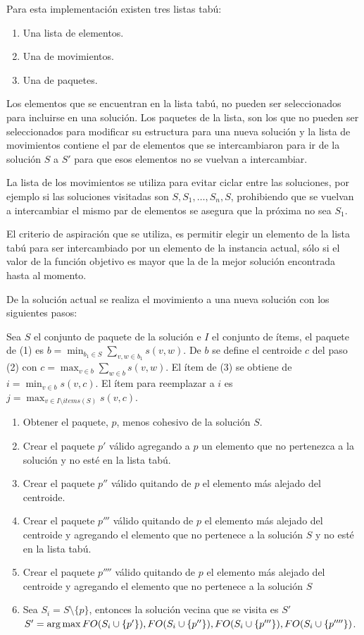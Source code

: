 Para esta implementación existen tres listas tabú: 
\begin{enumerate}
	\item Una lista de elementos.
	\item Una de movimientos.
	\item Una de paquetes.
\end{enumerate}

Los elementos que se encuentran en la lista tabú, no pueden ser seleccionados para incluirse en una solución. Los paquetes de la lista, son los que no pueden ser seleccionados para modificar su estructura para una nueva solución y la lista de movimientos contiene el par de elementos que se intercambiaron para ir de la solución $S$ a $S'$ para que esos elementos no se vuelvan a intercambiar.

La lista de los movimientos se utiliza para evitar ciclar entre las soluciones, por ejemplo si las soluciones visitadas son $S, S_1, \ldots, S_n, S$, prohibiendo que se vuelvan a intercambiar el mismo par de elementos se asegura que la próxima no sea $S_1$.

El criterio de aspiración que se utiliza, es permitir elegir un elemento de la lista tabú para ser intercambiado por un elemento de la instancia actual, sólo si el valor de la función objetivo es mayor que la de la mejor solución encontrada hasta al momento.

De la solución actual se realiza el movimiento a una nueva solución con los siguientes pasos:

Sea $S$ el conjunto de paquete de la solución e $I$ el conjunto de ítems, el paquete de (1) es $b = \min_{b_1 \in S}{\sum_{v,w \in b_1}{s(v,w)}}$. De $b$ se define el centroide $c$ del paso (2) con $c = \max_{v \in b}{\sum_{w \in b}{s(v,w)}}$. El ítem de (3) se obtiene de $i = \min_{v \in b}{s(v,c)}$. El ítem para reemplazar a $i$ es $j = \max_{v \in I \setminus items(S)}{s(v,c)}$.

\begin{enumerate}
	\item Obtener el paquete, $p$, menos cohesivo de la solución $S$.
	\item Crear el paquete $p'$ válido agregando a $p$ un elemento que no pertenezca a la solución y no esté en la lista tabú.
	\item Crear el paquete $p''$ válido quitando de $p$ el elemento más alejado del centroide.
	\item Crear el paquete $p'''$ válido quitando de $p$ el elemento más alejado del centroide y agregando el elemento que no pertenece a la solución $S$ y no esté en la lista tabú.
	\item Crear el paquete $p''''$ válido quitando de $p$ el elemento más alejado del centroide y agregando el elemento que no pertenece a la solución $S$
	\item Sea $S_{i} = S\setminus \{p\}$, entonces la solución vecina que se visita es $S'$\\
	$S' = \operatorname*{arg\,max} {FO(S_{i}\cup\{p'\}), FO(S_{i}\cup\{p''\}), FO(S_{i}\cup\{p'''\}), FO(S_{i}\cup\{p''''\})}$.
\end{enumerate}

